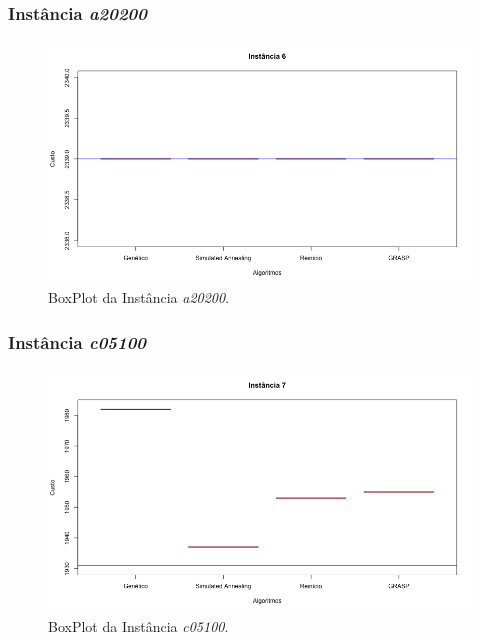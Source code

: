 \documentclass[portugues, brazil, a4paper,12pt]{article}
\begin{document}
		\subsubsection{Instância \textit{a20200}}
			\begin{figure}[H]
				\centering
				\includegraphics[width=1\linewidth]{img/6.png}
				\caption{BoxPlot da Instância \textit{a20200}.}
				\label{fig:a20200}
			\end{figure}
	

	
		\subsubsection{Instância \textit{c05100}}
			\begin{figure}[H]
				\centering
				\includegraphics[width=1\linewidth]{img/7.png}
				\caption{BoxPlot da Instância \textit{c05100}.}
				\label{fig:c05100}
			\end{figure}
	
\end{document}
